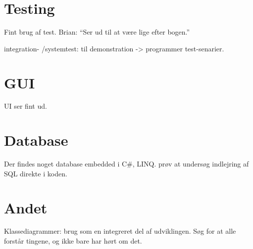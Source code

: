 \documentclass{article}
\begin{document}
\section{Testing}

Fint brug af test. Brian: \enquote{Ser ud til at være lige efter bogen.}

integration- /systemtest: til demonstration -> programmer test-senarier.


\section{GUI}

UI ser fint ud.

\section{Database}

Der findes noget database embedded i C#, LINQ. prøv at undersøg indlejring af SQL direkte i koden.

\section{Andet}

Klassediagrammer: brug som en integreret del af udviklingen.
Søg for at alle forstår tingene, og ikke bare har hørt om det.
\end{document}
